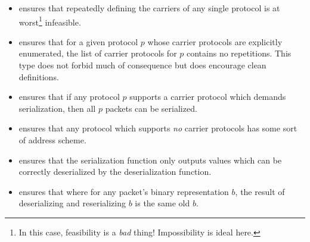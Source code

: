\documentclass{report}
\begin{document}
\begin{itemize}
\begin{itemize}
	\item {}  ensures that repeatedly defining the carriers of any single protocol is at worst\footnote{In this case, feasibility is a \emph{bad} thing!  Impossibility is ideal here.} infeasible.
	\item {}  ensures that for a given protocol \(p\) whose carrier protocols are explicitly enumerated, the list of carrier protocols for \(p\) contains no repetitions.   This type does not forbid much of consequence but does encourage clean definitions.
	\item {}  ensures that if any protocol \(p\) supports a carrier protocol which demands serialization, then all \(p\) packets can be serialized.
	\item {}  ensures that any protocol which supports \emph{no} carrier protocols has some sort of address scheme.
	\item {}  ensures that the serialization function only outputs values which can be correctly deserialized by the deserialization function.
	\item {}  ensures that where for any packet's binary representation \(b\), the result of deserializing and reserializing \(b\) is the same old \(b\).
\end{itemize}


\end{itemize}
\end{document}
